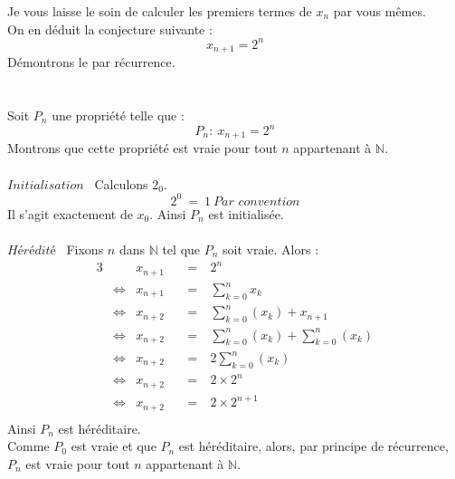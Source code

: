\documentclass[a4paper,fleqn]{article}
\date{\today}
\begin{document}
Je vous laisse le soin de calculer les premiers termes de $x_n$ par vous mêmes. \\
On en déduit la conjecture suivante :
\[
	x_{n+1}=2^n
\]
Démontrons le par récurrence. \\
\\ \\
Soit $P_n$ une propriété telle que :
\[
	P_n:~ x_{n+1}=2^n
\]
Montrons que cette propriété est vraie pour tout $n$ appartenant à $\mathbb{N}$. \\ \\
$\textit{Initialisation}$~ Calculons $2_0$.
\[
	2^0 ~=~ 1 ~\textit{Par convention} 
\]
Il s'agit exactement de $x_0$. Ainsi $P_n$ est initialisée. \\ \\
$\textit{Hérédité}$~ Fixons $n$ dans $\mathbb{N}$ tel que $P_n$ soit vraie.
Alors :
\begin{alignat*}{3}
	&&x_{n+1}&&~=~&2^n \\
	&\Leftrightarrow&x_{n+1}&&~=~&\displaystyle\sum^n_{k=0}x_k \\
	&\Leftrightarrow&x_{n+2}&&~=~&\displaystyle\sum^n_{k=0}(x_k)+x_{n+1} \\
	&\Leftrightarrow&x_{n+2}&&~=~&\displaystyle\sum^n_{k=0}(x_k)+\displaystyle\sum^n_{k=0}(x_k) \\
	&\Leftrightarrow&x_{n+2}&&~=~&2\displaystyle\sum^n_{k=0}(x_k) \\
	&\Leftrightarrow&x_{n+2}&&~=~&2\times 2^n \\
	&\Leftrightarrow&x_{n+2}&&~=~&2\times 2^{n+1} \\
\end{alignat*}
Ainsi $P_n$ est héréditaire. \\
Comme $P_0$ est vraie et que $P_n$ est héréditaire, alors, par principe de récurrence, $P_n$ est vraie pour tout $n$ appartenant à $\mathbb{N}$.
\end{document}
